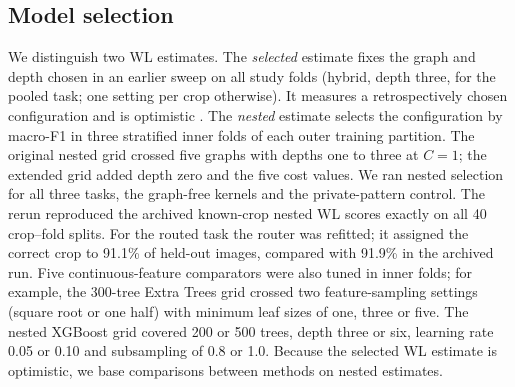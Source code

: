 \subsection{Model selection}
We distinguish two WL estimates. The \emph{selected} estimate fixes the graph and depth chosen in an earlier sweep on all study folds (hybrid, depth three, for the pooled task; one setting per crop otherwise). It measures a retrospectively chosen configuration and is optimistic \citep{Varma2006,Cawley2010}. The \emph{nested} estimate selects the configuration by macro-F1 in three stratified inner folds of each outer training partition. The original nested grid crossed five graphs with depths one to three at $C=1$; the extended grid added depth zero and the five cost values. We ran nested selection for all three tasks, the graph-free kernels and the private-pattern control. The rerun reproduced the archived known-crop nested WL scores exactly on all 40 crop--fold splits. For the routed task the router was refitted; it assigned the correct crop to 91.1\% of held-out images, compared with 91.9\% in the archived run. Five continuous-feature comparators were also tuned in inner folds; for example, the 300-tree Extra Trees grid crossed two feature-sampling settings (square root or one half) with minimum leaf sizes of one, three or five. The nested XGBoost grid covered 200 or 500 trees, depth three or six, learning rate 0.05 or 0.10 and subsampling of 0.8 or 1.0. Because the selected WL estimate is optimistic, we base comparisons between methods on nested estimates.

